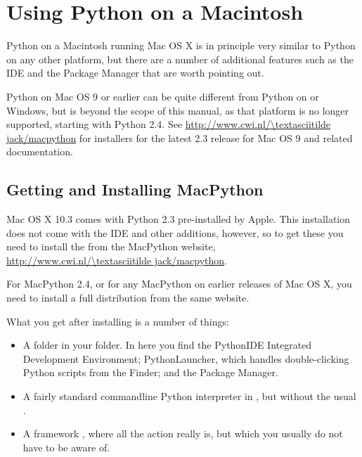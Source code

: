 \chapter{Using Python on a Macintosh \label{using}}

Python on a Macintosh running Mac OS X is in principle very similar to
Python on any other \UNIX{} platform, but there are a number of additional
features such as the IDE and the Package Manager that are worth pointing out.

Python on Mac OS 9 or earlier can be quite different from Python on
\UNIX{} or Windows, but is beyond the scope of this manual, as that platform
is no longer supported, starting with Python 2.4. See
\url{http://www.cwi.nl/\textasciitilde jack/macpython} for installers
for the latest 2.3 release for Mac OS 9 and related documentation.

\section{Getting and Installing MacPython \label{getting-OSX}}

Mac OS X 10.3 comes with Python 2.3 pre-installed by Apple.
This installation does not come with the IDE and other additions, however,
so to get these you need to install the 
from the MacPython website, \url{http://www.cwi.nl/\textasciitilde jack/macpython}.

For MacPython 2.4, or for any MacPython on earlier releases of Mac OS X,
you need to install a full distribution from the same website.

What you get after installing is a number of things:

\begin{itemize}
    \item A  folder in your 
    folder. In here you find the PythonIDE Integrated Development Environment;
    PythonLauncher, which handles double-clicking Python scripts from
    the Finder; and the Package Manager.
    
    \item A fairly standard \UNIX{} commandline Python interpreter in
    , but without the usual
    .
    
    \item A framework , where
    all the action really is, but which you usually do not have to be aware of.
\end{itemize}

